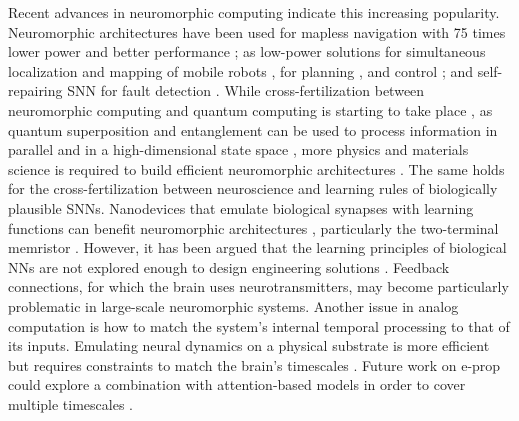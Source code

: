     Recent advances in neuromorphic computing indicate this increasing popularity.
    Neuromorphic architectures have been used for mapless navigation with 75 times lower power and better performance \citep{tang2020reinforcement}; as low-power solutions for simultaneous localization and mapping of mobile robots \citep{tang2019spiking}, for planning \citep{fischl2017path}, and control \citep{blum2017neuromorphic}; and self-repairing SNN for fault detection \citep{zhu2017target}.
    While cross-fertilization between neuromorphic computing and quantum computing is starting to take place \citep{russek2016stochastic}, as quantum superposition and entanglement can be used to process information in parallel and in a high-dimensional state space \citep{fujii2017harnessing, yamamoto2017coherent,tacchino2019artificial}, more physics and materials science is required to build efficient neuromorphic architectures \citep{markovic2020physics}.
    The same holds for the cross-fertilization between neuroscience and learning rules of biologically plausible SNNs.
    Nanodevices that emulate biological synapses with learning functions can benefit neuromorphic architectures \citep{yao2017face,wang2018photonic,ren2018analytical}, particularly the two-terminal memristor \citep{jo2010nanoscale,wang2017memristors}.
    However, it has been argued that the learning principles of biological NNs are not explored enough to design engineering solutions \citep{gorban2019unreasonable,taherkhani2018supervised}.
    Feedback connections, for which the brain uses neurotransmitters, may become particularly problematic in large-scale neuromorphic systems.
    Another issue in analog computation is how to match the system's internal temporal processing to that of its inputs.
    Emulating neural dynamics on a physical substrate is more efficient but requires constraints to match the brain's timescales \citep{mead1990neuromorphic,jaeger2021dimensions}.
    Future work on e-prop could explore a combination with attention-based models in order to cover multiple timescales \citep{bellec2020solution}.
